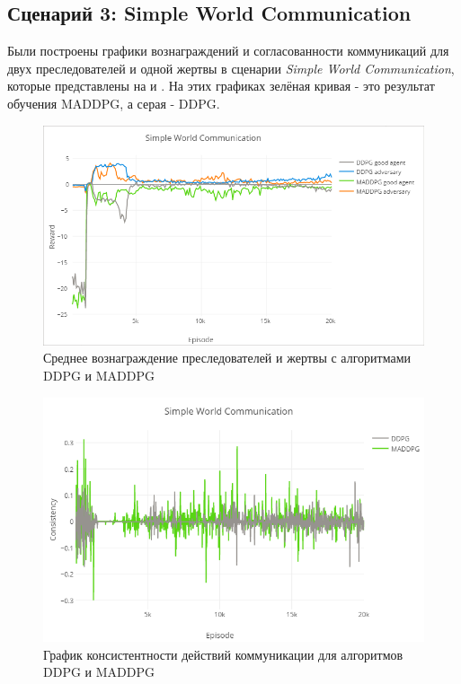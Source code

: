 \subsection{Сценарий 3: Simple World Communication} \label{exp-results-svc}

Были построены графики вознаграждений и согласованности коммуникаций для двух преследователей и одной жертвы в сценарии \textit{Simple World Communication}, которые представлены на  и . На этих графиках зелёная кривая - это результат обучения MADDPG, а серая - DDPG.

\begin{figure}[ht!]
	\center
	\includegraphics [scale=0.6] {my_folder/images/ch5/swc-rew.png}
	\caption{Среднее вознаграждение преследователей и жертвы с алгоритмами DDPG и MADDPG}
	\label{fig:result-swc-rew}
\end{figure}

\begin{figure}[ht!]
	\center
	\includegraphics [scale=0.6] {my_folder/images/ch5/swc-comm.png}
	\caption{График консистентности действий коммуникации для алгоритмов DDPG и MADDPG}
	\label{fig:result-swc-comm}
\end{figure}

